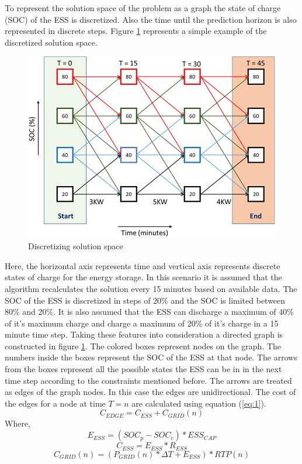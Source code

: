To represent the solution space of the problem as a graph the state of charge (SOC) of the ESS is discretized. Also the time until the prediction horizon is also represented in discrete steps. Figure \ref{fig:F1_Dis} represents a simple example of the discretized solution space.

\begin{figure}[!ht]
    \centering
    \includegraphics[width = \linewidth]{figs/F1_Dis.png}
    \caption{Discretizing solution space}
    \label{fig:F1_Dis}
\end{figure}
Here, the horizontal axis represents time and vertical axis represents discrete states of charge for the energy storage. In this scenario it is assumed that the algorithm recalculates the solution every 15 minutes based on available data. The SOC of the ESS is discretized in steps of 20\% and the SOC is limited between 80\% and 20\%. It is also assumed that the ESS can discharge a maximum of 40\% of it's maximum charge and charge a maximum of 20\% of it's charge in a 15 minute time step. Taking these features into consideration a directed graph is constructed in figure \ref{fig:F1_Dis}. The colored boxes represent nodes on the graph. The numbers inside the boxes represent the SOC of the ESS at that node. The arrows from the boxes represent all the possible states the ESS can be in in the next time step according to the constraints mentioned before. The arrows are treated as edges of the graph nodes. In this case the edges are unidirectional. The cost of the edges for a node at time $T = n$ are calculated using equation (\ref{eq:1}).
\begin{equation}
\label{eq:1}
    C_{EDGE} = C_{ESS}+C_{GRID}(n)
\end{equation}
Where,
$$
E_{ESS} = (SOC_p - SOC_c)*ESS_{CAP}
$$
$$
C_{ESS} = E_{ESS}*R_{ESS} 
$$
$$
C_{GRID}(n) = (P_{GRID}(n)*\Delta T + E_{ESS})*RTP(n)
$$

